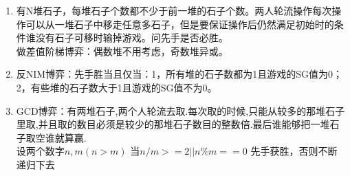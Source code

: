 \begin{enumerate}
\item 有N堆石子，每堆石子个数都不少于前一堆的石子个数。两人轮流操作每次操作可以从一堆石子中移走任意多石子，但是要保证操作后仍然满足初始时的条件谁没有石子可移时输掉游戏。问先手是否必胜。\\
做差值阶梯博弈：偶数堆不用考虑，奇数堆异或。
\item 反NIM博弈：先手胜当且仅当：1，所有堆的石子数都为1且游戏的SG值为0；2，有些堆的石子数大于1且游戏的SG值不为0。
\item GCD博弈：有两堆石子,两个人轮流去取.每次取的时候,只能从较多的那堆石子里取,并且取的数目必须是较少的那堆石子数目的整数倍.最后谁能够把一堆石子取空谁就算赢. \\
设两个数字$n,m(n>m)$ 当$n/m>=2||n\% m==0$ 先手获胜，否则不断递归下去
\end{enumerate}